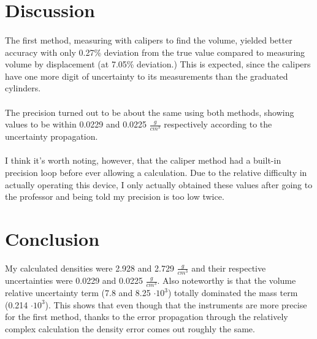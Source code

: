 \documentclass[fleqn,titlepage]{article}
\begin{document}
\section*{Discussion}
  \paragraph{} The first method, measuring with calipers to find the volume, yielded better accuracy with only 0.27\% deviation from the true value compared to measuring volume by displacement (at 7.05\% deviation.) This is expected, since the calipers have one more digit of uncertainty to its measurements than the graduated cylinders.
  \paragraph{} The precision turned out to be about the same using both methods, showing values to be within 0.0229 and 0.0225 $\frac{g}{cm^3}$ respectively according to the uncertainty propagation. 
  \paragraph{} I think it's worth noting, however, that the caliper method had a built-in precision loop before ever allowing a calculation. Due to the relative difficulty in actually operating this device, I only actually obtained these values after going to the professor and being told my precision is too low twice.
\section*{Conclusion}
My calculated densities were 2.928 and 2.729 $\frac{g}{cm^3}$ and their respective uncertainties were 0.0229 and 0.0225 $\frac{g}{cm^3}$. Also noteworthy is that the volume relative uncertainty term (7.8 and 8.25 $\cdot 10^3$) totally dominated the mass term (0.214 $\cdot 10^3$). This shows that even though that the instruments are more precise for the first method, thanks to the error propagation through the relatively complex calculation the density error comes out roughly the same.
\end{document}

